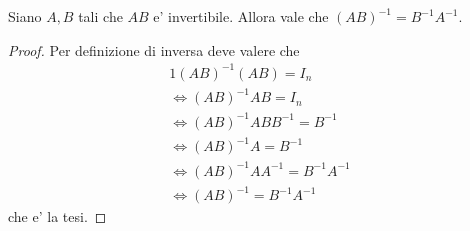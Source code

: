 \begin{proposition}
    \label{inversa_prodotto}
    Siano $A, B$ tali che $AB$ e' invertibile. Allora vale che $(AB)^{-1} = B^{-1}A^{-1}$.
\end{proposition}
\begin{proof}
    Per definizione di inversa deve valere che \begin{alignat*}
        {1}
        (AB)^{-1}(AB) = I_n \\
        \iff (AB)^{-1}AB = I_n \\
        \iff (AB)^{-1}ABB^{-1} = B^{-1}\\
        \iff (AB)^{-1}A = B^{-1}\\
        \iff (AB)^{-1}AA^{-1} = B^{-1}A^{-1}\\
        \iff (AB)^{-1} = B^{-1}A^{-1}
    \end{alignat*} 
    che e' la tesi.
\end{proof}

